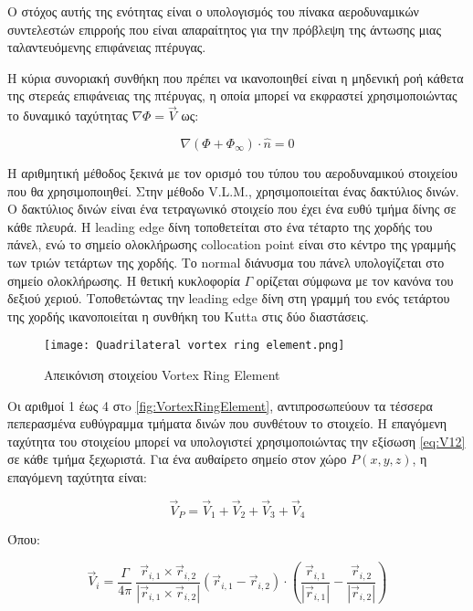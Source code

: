 Ο στόχος αυτής της ενότητας είναι ο υπολογισμός του πίνακα αεροδυναμικών συντελεστών επιρροής που είναι απαραίτητος για την πρόβλεψη της άντωσης μιας ταλαντευόμενης επιφάνειας πτέρυγας.

Η κύρια συνοριακή συνθήκη που πρέπει να ικανοποιηθεί είναι η μηδενική ροή κάθετα της στερεάς επιφάνειας της πτέρυγας, η οποία μπορεί να εκφραστεί χρησιμοποιώντας το δυναμικό ταχύτητας $\nabla\Phi = \vec{V}$ ως:

\begin{equation}
\nabla\left( \Phi + \Phi_{\infty} \right) \cdot \hat{n} = 0
\end{equation}

Η αριθμητική μέθοδος ξεκινά με τον ορισμό του τύπου του αεροδυναμικού στοιχείου που θα χρησιμοποιηθεί. Στην μέθοδο \textlatin{V.L.M.}, χρησιμοποιείται ένας δακτύλιος δινών. Ο δακτύλιος δινών είναι ένα τετραγωνικό στοιχείο που έχει ένα ευθύ τμήμα δίνης σε κάθε πλευρά. H \textlatin{leading edge} δίνη τοποθετείται στο ένα τέταρτο της χορδής του πάνελ, ενώ το σημείο ολοκλήρωσης \textlatin{collocation point} είναι στο κέντρο της γραμμής των τριών τετάρτων της χορδής. Το \textlatin{normal} διάνυσμα του πάνελ υπολογίζεται στο σημείο ολοκλήρωσης. Η θετική κυκλοφορία $\Gamma$ ορίζεται σύμφωνα με τον κανόνα του δεξιού χεριού. Τοποθετώντας την \textlatin{leading edge} δίνη στη γραμμή του ενός τετάρτου της χορδής ικανοποιείται η συνθήκη του \textlatin{Kutta} στις δύο διαστάσεις.

\begin{figure}[H]
  \centering
  \texttt{[image: Quadrilateral vortex ring element.png]}
  \caption{Απεικόνιση στοιχείου \textlatin{Vortex Ring Element}}
  \label{fig:VortexRingElement}
\end{figure}



Οι αριθμοί 1 έως 4 στo \autoref{fig:VortexRingElement}, αντιπροσωπεύουν τα τέσσερα πεπερασμένα ευθύγραμμα τμήματα δινών που συνθέτουν το στοιχείο. Η επαγόμενη ταχύτητα του στοιχείου μπορεί να υπολογιστεί χρησιμοποιώντας την εξίσωση \eqref{eq:V12} σε κάθε τμήμα ξεχωριστά. Για ένα αυθαίρετο σημείο στον χώρο $P(x,y,z)$, η επαγόμενη ταχύτητα είναι:

\begin{equation}
{\vec{V}}_{P} = {\vec{V}}_{1} + {\vec{V}}_{2} + {\vec{V}}_{3} + {\vec{V}}_{4}
\end{equation}

Όπου:

\begin{equation}
    \label{eq:Vi}
{\vec{V}}_{i} = \frac{\Gamma}{4\pi}\ \frac{{\vec{r}}_{i,1} \times {\vec{r}}_{i,2}}{\left| {\vec{r}}_{i,1} \times {\vec{r}}_{i,2} \right|}({\vec{r}}_{i,1} - {\vec{r}}_{i,2}) \cdot \left( \frac{{\vec{r}}_{i,1}}{\left| {\vec{r}}_{i,1} \right|} - \frac{{\vec{r}}_{i,2}}{\left| {\vec{r}}_{i,2} \right|} \right)
\end{equation}

